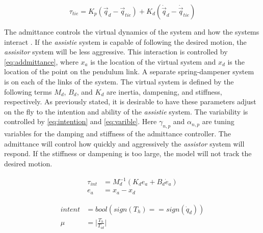 \begin{equation}
        \tau_{tie} = K_p( \vec{q}_d - \vec{q}_{tie} ) + K_d ( \dot{\vec{q}}_d - \dot{\vec{q}}_{tie} ) 
    \label{eq:PDcnrl}
\end{equation}

The admittance controls the virtual dynamics of the system and how the systems interact \cite{faulring2005haptic}. If the \textit{assistie} system is capable of following the desired motion, the \textit{assisitor} system will be less aggressive. This interaction is controlled by \autoref{eq:addmittance}, where $x_a$ is the location of the virtual system and $x_d$ is the location of the point on the pendulum link. A separate spring-dampener system is on each of the links of the system. The virtual system is defined by the following terms $M_d$, $B_d$, and $K_d$ are inertia, dampening, and stiffness, respectively. As previously stated, it is desirable to have these parameters adjust on the fly to the intention and ability of the \textit{assistie} system. The variability is controlled by \autoref{eq:intention} and \autoref{eq:varible}. Here $\gamma_{n,p}$ and $\alpha_{n,p}$ are tuning variables for the damping and stiffness of the admittance controller. The admittance will control how quickly and aggressively the \textit{assistor} system will respond. If the stiffness or dampening is too large, the model will not track the desired motion.   

\begin{equation}
    \begin{aligned}
        \tau_{int} &= M_d^{-1}( K_d e_a + B_d \dot{e}_a)  \\
        e_a &= x_a - x_d 
    \end{aligned}
    \label{eq:addmittance}
\end{equation}

\begin{equation}
    \begin{aligned}
         intent &= bool ( sign(T_h) == sign(\dot{q}_d) ) \\
         \mu &= \Big|\frac{T_h}{T_{id}} \Big|
    \end{aligned}
    \label{eq:intention}
\end{equation}




